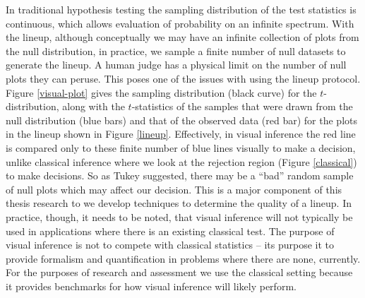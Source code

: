 In traditional hypothesis testing the sampling distribution of the test statistics is continuous, which allows evaluation of probability on an infinite spectrum. With the lineup, although conceptually we may have an infinite collection of plots from the null distribution, in practice, we sample a finite number of null datasets to generate the lineup. A human judge has a physical limit on the number of null plots they can peruse. This poses one of the issues with using the lineup protocol.  Figure \ref{visual-plot} gives the sampling distribution (black curve) for the $t$-distribution, along with the $t$-statistics of the samples that were drawn from the null distribution (blue bars) and that of the observed data (red bar) for the plots in the lineup shown in Figure \ref{lineup}. Effectively,  in visual inference the red line is compared only to these finite number of blue lines visually to make a decision, unlike classical inference where we look at the rejection region (Figure \ref{classical}) to make decisions. So as Tukey suggested, there may be a ``bad'' random sample of null plots which may affect our decision. This is a major component of this thesis research to we develop techniques to determine the quality of a lineup. In practice, though, it needs to be noted, that visual inference will not typically be used in applications where there is an existing classical test. The purpose of visual inference is not to compete with classical statistics -- its purpose it to provide formalism and quantification in problems where there are none, currently. For the purposes of research and assessment we use the classical setting because it provides benchmarks for how visual inference will likely perform.

 


